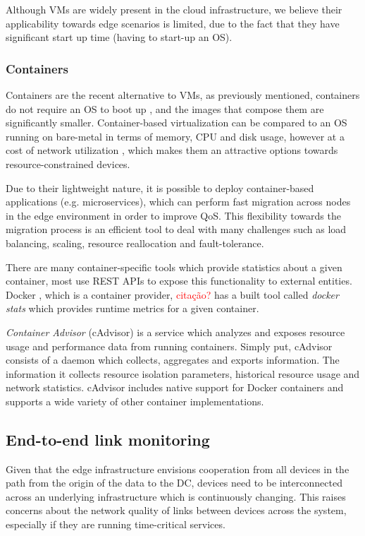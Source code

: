 Although VMs are widely present in the cloud infrastructure, we believe their applicability towards edge scenarios is limited, due to the fact that they have significant start up time (having to start-up an OS).  

\subsubsection{Containers}

Containers are the recent alternative to VMs, as previously mentioned, containers do not require an OS to boot up \cite{}, and the images that compose them are significantly smaller. Container-based virtualization can be compared to an OS running on bare-metal in terms of memory, CPU and disk usage, however at a cost of network utilization \cite{preeth2015evaluation}, which makes them an attractive options towards resource-constrained devices.

Due to their lightweight nature, it is possible to deploy container-based applications (e.g. microservices), which can perform fast migration across nodes in the edge environment in order to improve QoS. This flexibility towards the migration process is an efficient tool to deal with many challenges such as load balancing, scaling, resource reallocation and fault-tolerance. 

There are many container-specific tools which provide statistics about a given container, most use REST APIs to expose this functionality to external entities. Docker \cite{docker}, which is a container provider, \textcolor{red}{citação?} has a built tool called \textit{docker stats} \cite{docker_stats} which provides runtime metrics for a given container.

\textit{Container Advisor} \cite{cAdvisor} (cAdvisor) is a service which analyzes and exposes resource usage and performance data from running containers. Simply put, cAdvisor consists of a daemon which collects, aggregates and exports information. The information it collects resource isolation parameters, historical resource usage and network statistics. cAdvisor includes native support for Docker containers and supports a wide variety of other container implementations.


\subsection{End-to-end link monitoring}

Given that the edge infrastructure envisions cooperation from all devices in the path from the origin of the data to the DC, devices need to be interconnected across an underlying infrastructure which is continuously changing. This raises concerns about the network quality of links between devices across the system, especially if they are running time-critical services. 

